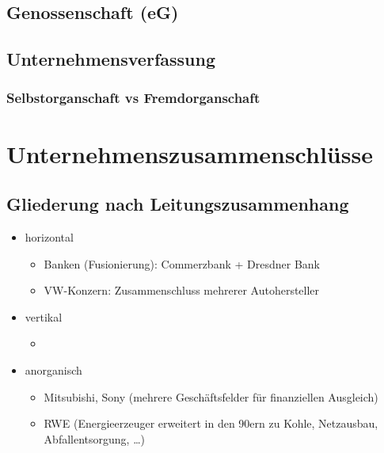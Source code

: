 \documentclass{scrreprt}
\begin{document}
\subsection{Genossenschaft (eG)}

\subsection{Unternehmensverfassung}
\subsubsection{Selbstorganschaft vs Fremdorganschaft}

\section{Unternehmenszusammenschlüsse}
\subsection{Gliederung nach Leitungszusammenhang}
\begin{itemize}
\item horizontal
\begin{itemize}
\item Banken (Fusionierung): Commerzbank + Dresdner Bank
\item VW-Konzern: Zusammenschluss mehrerer Autohersteller
\end{itemize}
\item vertikal
\begin{itemize}
\item 
\end{itemize}
\item anorganisch
\begin{itemize}
\item Mitsubishi, Sony (mehrere Geschäftsfelder für finanziellen Ausgleich)
\item RWE (Energieerzeuger erweitert in den 90ern zu Kohle, Netzausbau, Abfallentsorgung, …)
\end{itemize}
\end{itemize}
\end{document}

